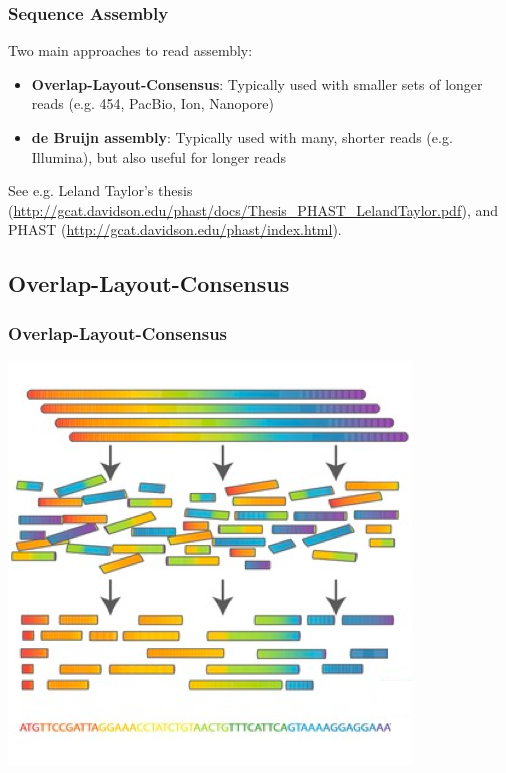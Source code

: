 

\begin{frame}
  \frametitle{Sequence Assembly}
  Two main approaches to read assembly:
  \begin{itemize}
    \item \textbf{Overlap-Layout-Consensus}: Typically used with smaller sets of longer reads (e.g. 454, PacBio, Ion, Nanopore)
    \item \textbf{de Bruijn assembly}: Typically used with many, shorter reads (e.g. Illumina), but also useful for longer reads
  \end{itemize}
  See e.g. Leland Taylor's thesis (\href{http://gcat.davidson.edu/phast/docs/Thesis_PHAST_LelandTaylor.pdf}{http://gcat.davidson.edu/phast/docs/Thesis\_PHAST\_LelandTaylor.pdf}), and PHAST (\href{http://gcat.davidson.edu/phast/index.html}{http://gcat.davidson.edu/phast/index.html}).
\end{frame}

\subsection{Overlap-Layout-Consensus}

\begin{frame}
  \frametitle{Overlap-Layout-Consensus}
  \begin{center}
    \includegraphics[height=0.8\textheight]{images/overlap-layout-consensus}
  \end{center}  
\end{frame}

